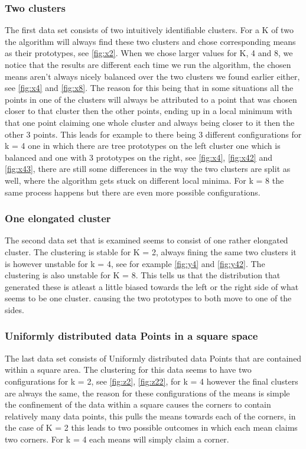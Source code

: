 \documentclass[10pt,a4paper]{article}
\begin{document}
\subsubsection{Two clusters	}
The first data set consists of two intuitively identifiable clusters. For a K of two the algorithm will always find these two clusters and chose corresponding means as their prototypes, see \ref{fig:x2}. 
When we chose larger values for K, 4 and 8, we notice that the results are different each time we run the algorithm, the chosen means aren't always nicely balanced over the two clusters we found earlier either, see \ref{fig:x4} and \ref{fig:x8}. The reason for this being that in some situations all the points in one of the clusters will always be attributed to a point that was chosen  closer to that cluster then the other points, ending up in a local minimum with that one point claiming one whole cluster and always being closer to it then the other 3 points. 
This leads for example to there being 3 different configurations for k = 4 one in which there are tree prototypes on the left cluster one which is balanced and one with 3 prototypes on the right, see \ref{fig:x4}, \ref{fig:x42} and \ref{fig:x43}, there are still some differences in the way the two clusters are split as well, where the algorithm gets stuck on different local minima. For k = 8 the same process happens but there are even more possible configurations.
\subsubsection{One elongated cluster}
The second data set that is examined seems to consist of one rather elongated cluster. The clustering is stable for K = 2, always fining the same two clusters it is however unstable for k = 4, see for example \ref{fig:y4} and \ref{fig:y42}. The clustering is also unstable for K = 8. This tells us that the distribution that generated these is atleast a little biased towards the left or the right side of what seems to be one cluster. causing the two prototypes to both move to one of the sides.
\subsubsection{Uniformly distributed data Points in a square space}
The last data set consists of Uniformly distributed data Points that are contained within a square area. The clustering for this data seems to have two configurations for k = 2, see \ref{fig:z2}, \ref{fig:z22}, for k = 4 however the final clusters are always the same, the reason for these configurations of the means is simple the confinement of the data within a square causes the corners to contain relatively many data points, this pulls the means towards each of the corners, in the case of K = 2 this leads to two possible outcomes in which each mean claims two corners. For k = 4 each means will simply claim a corner.
\end{document}
